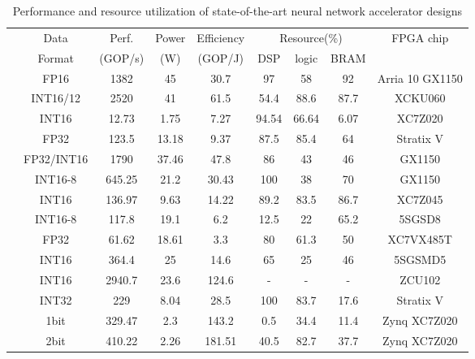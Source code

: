 \begin{table}[htbp]
    \centering
    \caption{Performance and resource utilization of state-of-the-art neural network accelerator designs}
    \begin{tabular}{|r|c|c|c|c|c|c|c|c|}
        \hline
        \multicolumn{1}{|c|}{} & Data  & Perf. & Power & Efficiency & \multicolumn{3}{c|}{Resource(\%)} & \multirow{2}[4]{*}{FPGA chip} \bigstrut\\
    \cline{6-8}    \multicolumn{1}{|c|}{} & Format & (GOP/s) & (W)   & (GOP/J) & DSP   & logic & BRAM  &  \bigstrut\\
        \hline
            \cite{aydonat2017opencl} & FP16  & 1382  & 45    & 30.7  & 97    & 58    & 92    & Arria 10 GX1150 \bigstrut[t]\\
            \cite{han2017ese} & INT16/12 & 2520  & 41    & 61.5  & 54.4  & 88.6  & 87.7  & XCKU060 \\
            \cite{venieris2017fpgaconvnet} & INT16 & 12.73 & 1.75  & 7.27  & 94.54 & 66.64 & 6.07  & XC7Z020 \\
            \cite{zhang2017frequency} & FP32  & 123.5 & 13.18 & 9.37  & 87.5  & 85.4  & 64    & Stratix V \\
            \cite{zhang2017improving} & FP32/INT16 & 1790  & 37.46 & 47.8  & 86    & 43    & 46    & GX1150 \\
            \cite{ma2017optimizing} & INT16-8 & 645.25 & 21.2  & 30.43 & 100   & 38    & 70    & GX1150 \\
            \cite{qiu2016going} & INT16 & 136.97 & 9.63  & 14.22 & 89.2  & 83.5  & 86.7  & XC7Z045 \\
            \cite{suda2016throughput} & INT16-8 & 117.8 & 19.1  & 6.2   & 12.5  & 22    & 65.2  & 5SGSD8 \\
            \cite{zhang2015optimizing} & FP32  & 61.62 & 18.61 & 3.3   & 80    & 61.3  & 50    & XC7VX485T \\
            \cite{guan2017fp} & INT16 & 364.4 & 25    & 14.6  & 65    & 25    & 46    & 5SGSMD5 \\
            \cite{lu2017evaluating} & INT16 & 2940.7 & 23.6  & 124.6 &   -   &   -   &   -   & ZCU102 \\
            \cite{podili2017fast} & INT32 & 229   & 8.04  & 28.5  & 100   & 83.7  & 17.6  & Stratix V \\
            \cite{nakahara2017fully} & 1bit  & 329.47 & 2.3   & 143.2 & 0.5   & 34.4  & 11.4  & Zynq XC7Z020 \\
            \cite{jiao2017accelerating} & 2bit  & 410.22 & 2.26  & 181.51 & 40.5  & 82.7  & 37.7  & Zynq XC7Z020 \\

\end{tabular}
\end{table}
